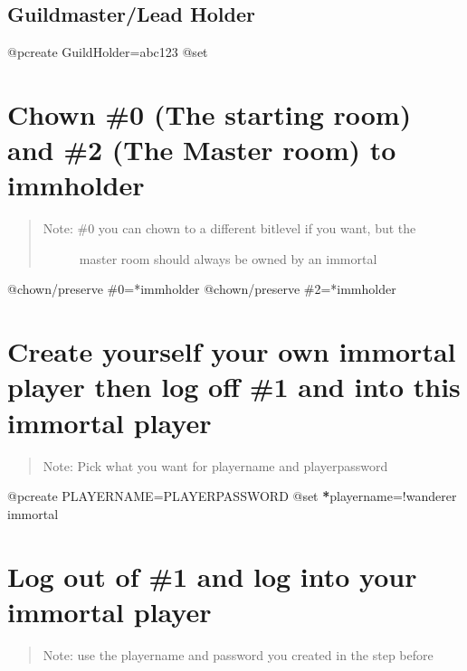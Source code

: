 \documentclass[letterpaper,10pt,english]{sphinxmanual}
\begin{document}
\subsection{Guildmaster/Lead Holder}
\label{\detokenize{05-newmush:guildmaster-lead-holder}}
\sphinxAtStartPar
@pcreate GuildHolder=abc123
@set 


\section{Chown \#0 (The starting room) and \#2 (The Master room) to immholder}
\label{\detokenize{05-newmush:chown-0-the-starting-room-and-2-the-master-room-to-immholder}}\begin{quote}
\begin{description}
\item[{Note: \#0 you can chown to a different bitlevel if you want, but the}] \leavevmode
\sphinxAtStartPar
master room should always be owned by an immortal

\end{description}
\end{quote}

\sphinxAtStartPar
@chown/preserve \#0=*immholder
@chown/preserve \#2=*immholder


\section{Create yourself your own immortal player then log off \#1 and into this immortal player}
\label{\detokenize{05-newmush:create-yourself-your-own-immortal-player-then-log-off-1-and-into-this-immortal-player}}\begin{quote}

\sphinxAtStartPar
Note: Pick what you want for playername and playerpassword
\end{quote}

\sphinxAtStartPar
@pcreate PLAYERNAME=PLAYERPASSWORD
@set {\color{red}\bfseries{}*}playername=!wanderer immortal


\section{Log out of \#1 and log into your immortal player}
\label{\detokenize{05-newmush:log-out-of-1-and-log-into-your-immortal-player}}\begin{quote}

\sphinxAtStartPar
Note: use the playername and password you created in the step before
\end{quote}
\end{document}

